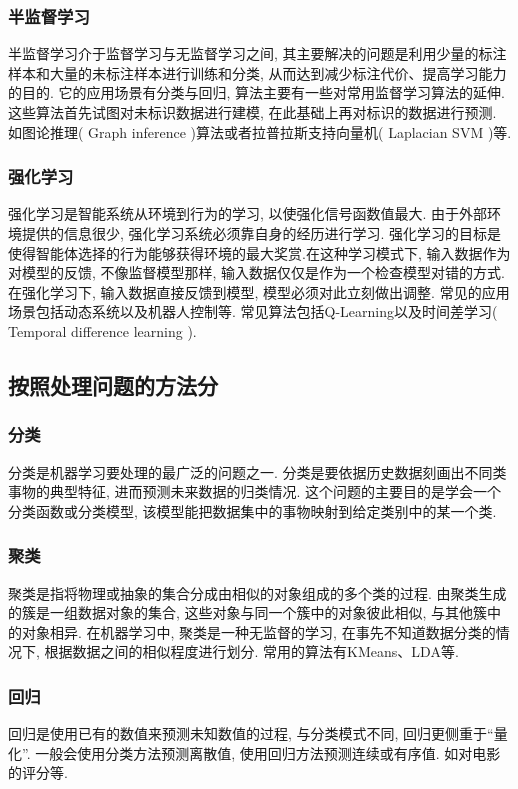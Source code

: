\documentclass[lang=cn,11pt,a4paper]{elegantpaper}
\begin{document}
\subsubsection*{半监督学习}
半监督学习介于监督学习与无监督学习之间, 其主要解决的问题是利用少量的标注样本和大量的未标注样本进行训练和分类, 从而达到减少标注代价、提高学习能力的目的. 它的应用场景有分类与回归, 算法主要有一些对常用监督学习算法的延伸. 这些算法首先试图对未标识数据进行建模, 在此基础上再对标识的数据进行预测. 如图论推理( Graph inference )算法或者拉普拉斯支持向量机( Laplacian SVM )等. 
\subsubsection*{强化学习}
强化学习是智能系统从环境到行为的学习, 以使强化信号函数值最大. 由于外部环境提供的信息很少, 强化学习系统必须靠自身的经历进行学习. 强化学习的目标是使得智能体选择的行为能够获得环境的最大奖赏.在这种学习模式下, 输入数据作为对模型的反馈, 不像监督模型那样, 输入数据仅仅是作为一个检查模型对错的方式. 在强化学习下, 输入数据直接反馈到模型, 模型必须对此立刻做出调整. 常见的应用场景包括动态系统以及机器人控制等. 常见算法包括Q-Learning以及时间差学习( Temporal difference learning ). 
\subsection{按照处理问题的方法分}
\subsubsection*{分类}
分类是机器学习要处理的最广泛的问题之一. 分类是要依据历史数据刻画出不同类事物的典型特征, 进而预测未来数据的归类情况. 这个问题的主要目的是学会一个分类函数或分类模型, 该模型能把数据集中的事物映射到给定类别中的某一个类. 
\subsubsection*{聚类}
聚类是指将物理或抽象的集合分成由相似的对象组成的多个类的过程. 由聚类生成的簇是一组数据对象的集合, 这些对象与同一个簇中的对象彼此相似, 与其他簇中的对象相异. 在机器学习中, 聚类是一种无监督的学习, 在事先不知道数据分类的情况下, 根据数据之间的相似程度进行划分. 常用的算法有KMeans、LDA等. 
\subsubsection*{回归}
回归是使用已有的数值来预测未知数值的过程, 与分类模式不同, 回归更侧重于“量化”. 一般会使用分类方法预测离散值, 使用回归方法预测连续或有序值. 如对电影的评分等. 
\end{document}
